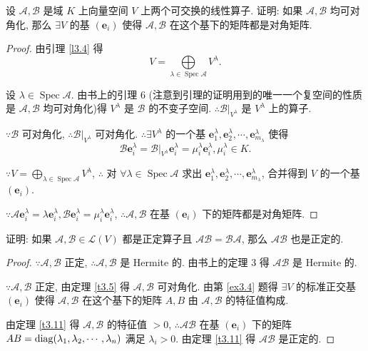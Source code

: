\documentclass[color=black,device=normal,lang=cn,mode=geye]{elegantnote}
\begin{document}
\begin{exercise}\label{ex3.4}
    设 $\mathcal{A},\mathcal{B}$ 是域 $K$ 上向量空间 $V$ 上两个可交换的线性算子. 证明: 如果 $\mathcal{A},\mathcal{B}$ 均可对角化, 那么 $\exists V$ 的基 $(\boldsymbol{e}_i)$ 使得 $\mathcal{A},\mathcal{B}$ 在这个基下的矩阵都是对角矩阵.
\end{exercise}
\begin{proof}
    由引理 \ref{l3.4} 得
    \[V=\bigoplus\limits_{\lambda\in\operatorname{Spec}\mathcal{A}}V^\lambda.\]

    设 $\lambda\in\operatorname{Spec}\mathcal{A}$. 由书上的引理 6 (注意到引理的证明用到的唯一一个复空间的性质是 $\mathcal{A},\mathcal{B}$ 均可对角化)得 $V^\lambda$ 是 $\mathcal{B}$ 的不变子空间. $\therefore\mathcal{B}|_{V^\lambda}$ 是 $V^\lambda$ 上的算子.
    
    $\because\mathcal{B}$ 可对角化, $\therefore\mathcal{B}|_{V^\lambda}$ 可对角化. $\therefore\exists V^\lambda$ 的一个基 $\boldsymbol{e}^\lambda_1,\boldsymbol{e}^\lambda_2,\cdots,\boldsymbol{e}^\lambda_{m_\lambda}$ 使得 
    \[\mathcal{B}\boldsymbol{e}^\lambda_i=\mathcal{B}|_{V^\lambda}\boldsymbol{e}^\lambda_i=\mu^\lambda_i\boldsymbol{e}^\lambda_i,\mu^\lambda_i\in K.\]

    $\because V=\bigoplus\limits_{\lambda\in\operatorname{Spec}\mathcal{A}}V^\lambda$, $\therefore$ 对 $\forall\lambda\in\operatorname{Spec}\mathcal{A}$ 求出 $\boldsymbol{e}^\lambda_1,\boldsymbol{e}^\lambda_2,\cdots,\boldsymbol{e}^\lambda_{m_\lambda}$, 合并得到 $V$ 的一个基 $(\boldsymbol{e}_i)$.

    $\because\mathcal{A}\boldsymbol{e}^\lambda_i=\lambda\boldsymbol{e}^\lambda_i,\mathcal{B}\boldsymbol{e}^\lambda_i=\mu^\lambda_i\boldsymbol{e}^\lambda_i$, $\therefore\mathcal{A},\mathcal{B}$ 在基 $(\boldsymbol{e}_i)$ 下的矩阵都是对角矩阵.
\end{proof}
\begin{exercise}%
    证明: 如果 $\mathcal{A},\mathcal{B}\in\mathcal{L}(V)$ 都是正定算子且 $\mathcal{AB}=\mathcal{BA}$, 那么 $\mathcal{AB}$ 也是正定的.
\end{exercise}
\begin{proof}
    $\because\mathcal{A},\mathcal{B}$ 正定, $\therefore\mathcal{A},\mathcal{B}$ 是 Hermite 的. 由书上的定理 3 得 $\mathcal{AB}$ 是 Hermite 的.

    $\because\mathcal{A},\mathcal{B}$ 正定, 由定理 \ref{t3.5} 得 $\mathcal{A},\mathcal{B}$ 可对角化. 由第 \ref{ex3.4} 题得 $\exists V$ 的标准正交基 $(\boldsymbol{e}_i)$ 使得 $\mathcal{A},\mathcal{B}$ 在这个基下的矩阵 $A,B$ 由 $\mathcal{A},\mathcal{B}$ 的特征值构成.
    
    由定理 \ref{t3.11} 得 $\mathcal{A},\mathcal{B}$ 的特征值 $>0$, $\therefore\mathcal{AB}$ 在基 $(\boldsymbol{e}_i)$ 下的矩阵 $AB=\operatorname{diag} (\lambda_1,\lambda_2,\cdots,\lambda_n)$ 满足 $\lambda_i>0$. 由定理 \ref{t3.11} 得 $\mathcal{AB}$ 是正定的.
\end{proof}
\end{document}
